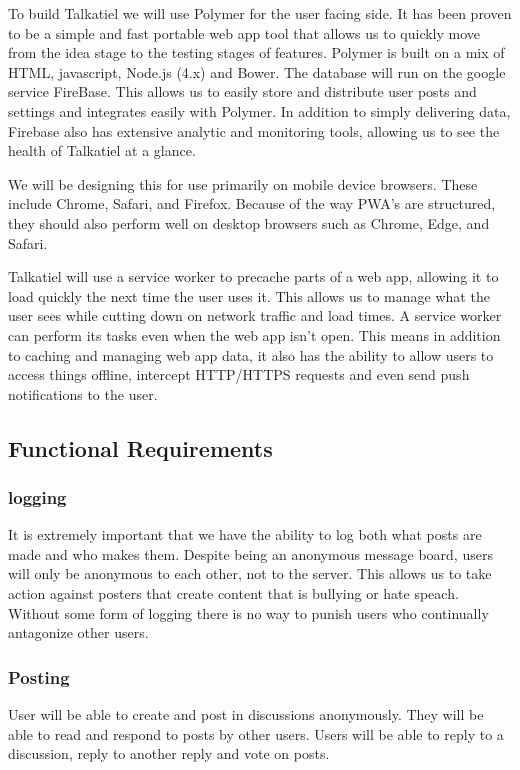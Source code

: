 \documentclass[12pt]{article}
\begin{document}
	To build Talkatiel we will use Polymer for the user facing side.  It has been proven to be a simple and fast portable web app tool that allows us to quickly move from the idea stage to the testing stages of features.  Polymer is built on a mix of HTML, javascript, Node.js (4.x) and Bower.  The database will run on the google service FireBase.  This allows us to easily store and distribute user posts and settings and integrates easily with Polymer.  In addition to simply delivering data, Firebase also has extensive analytic and monitoring tools, allowing us to see the health of Talkatiel at a glance.

	We will be designing this for use primarily on mobile device browsers.  These include Chrome, Safari, and Firefox.  Because of the way PWA’s are structured, they should also perform well on desktop browsers such as Chrome, Edge, and Safari.

  Talkatiel will use a service worker to precache parts of a web app, allowing it to load quickly the next time the user uses it.  This allows us to manage what the user sees while cutting down on network traffic and load times.  A service worker can perform its tasks even when the web app isn’t open.  This means in addition to caching and managing web app data, it also has the ability to allow users to access things offline, intercept HTTP/HTTPS requests and even send push notifications to the user.
  
\subsection{Functional Requirements}
\subsubsection{logging}
It is extremely important that we have the ability to log both what posts are made and who makes them.  Despite being an anonymous message board, users will only be anonymous to each other, not to the server.  This allows us to take action against posters that create content that is bullying or hate speach.  Without some form of logging there is no way to punish users who continually antagonize other users.

\subsubsection{Posting}
User will be able to create and post in discussions anonymously.  They will be able to read and respond to posts by other users.  Users will be able to reply to a discussion, reply to another reply and vote on posts.
\end{document}
